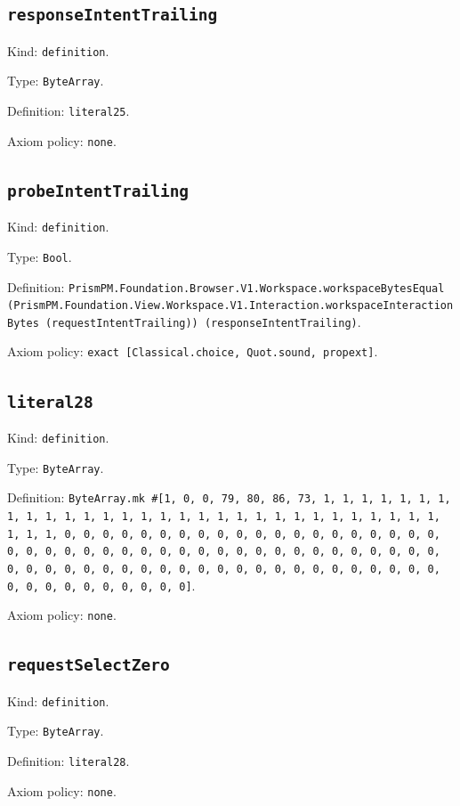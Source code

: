 \documentclass[11pt]{article}
\begin{document}
\subsection*{\texttt{responseIntentTrailing}}
\noindent Kind: \texttt{definition}.\par
\noindent Type: \texttt{ByteArray}.\par
\noindent Definition: \texttt{literal25}.\par
\noindent Axiom policy: \texttt{none}.\par
\subsection*{\texttt{probeIntentTrailing}}
\noindent Kind: \texttt{definition}.\par
\noindent Type: \texttt{Bool}.\par
\noindent Definition: \texttt{PrismPM.Foundation.Browser.V1.Workspace.workspaceBytesEqual (PrismPM.Foundation.View.Workspace.V1.Interaction.workspaceInteractionBytes (requestIntentTrailing)) (responseIntentTrailing)}.\par
\noindent Axiom policy: \texttt{exact [Classical.choice, Quot.sound, propext]}.\par
\subsection*{\texttt{literal28}}
\noindent Kind: \texttt{definition}.\par
\noindent Type: \texttt{ByteArray}.\par
\noindent Definition: \texttt{ByteArray.mk \#[1, 0, 0, 79, 80, 86, 73, 1, 1, 1, 1, 1, 1, 1, 1, 1, 1, 1, 1, 1, 1, 1, 1, 1, 1, 1, 1, 1, 1, 1, 1, 1, 1, 1, 1, 1, 1, 1, 1, 1, 0, 0, 0, 0, 0, 0, 0, 0, 0, 0, 0, 0, 0, 0, 0, 0, 0, 0, 0, 0, 0, 0, 0, 0, 0, 0, 0, 0, 0, 0, 0, 0, 0, 0, 0, 0, 0, 0, 0, 0, 0, 0, 0, 0, 0, 0, 0, 0, 0, 0, 0, 0, 0, 0, 0, 0, 0, 0, 0, 0, 0, 0, 0, 0, 0, 0, 0, 0, 0, 0, 0, 0, 0, 0, 0, 0]}.\par
\noindent Axiom policy: \texttt{none}.\par
\subsection*{\texttt{requestSelectZero}}
\noindent Kind: \texttt{definition}.\par
\noindent Type: \texttt{ByteArray}.\par
\noindent Definition: \texttt{literal28}.\par
\noindent Axiom policy: \texttt{none}.\par
\end{document}
